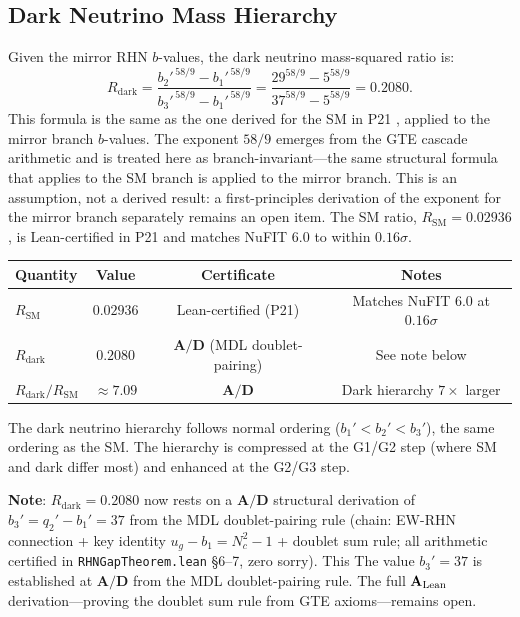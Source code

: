\documentclass[11pt]{article}
\newcommand{\CatAL}{\ensuremath{\textbf{A}_{\rm Lean}}}
\newcommand{\CatAD}{\textbf{A/D}}
\begin{document}
\subsection{Dark Neutrino Mass Hierarchy}
\label{ssec:dark_nu_mass}

Given the mirror RHN $b$-values, the dark neutrino mass-squared ratio is:
\begin{equation}
R_\mathrm{dark}
= \frac{b_2'^{\,58/9} - b_1'^{\,58/9}}{b_3'^{\,58/9} - b_1'^{\,58/9}}
= \frac{29^{58/9} - 5^{58/9}}{37^{58/9} - 5^{58/9}}
= 0.2080.
\label{eq:r_dark}
\end{equation}
This formula is the same as the one derived for the SM in P21 \cite{SpivackNeutrino},
applied to the mirror branch $b$-values. The exponent $58/9$ emerges from the GTE
cascade arithmetic and is treated here as branch-invariant---the same structural formula
that applies to the SM branch is applied to the mirror branch. This is an assumption,
not a derived result: a first-principles derivation of the exponent for the mirror branch
separately remains an open item. The SM ratio, $R_\mathrm{SM} = 0.02936$, is
Lean-certified in P21 and matches NuFIT 6.0 \cite{NuFIT60} to within $0.16\sigma$.

\begin{center}
\begin{tabular}{lccc}
\toprule
Quantity & Value & Certificate & Notes \\
\midrule
$R_\mathrm{SM}$ & $0.02936$ & Lean-certified (P21) & Matches NuFIT 6.0 at $0.16\sigma$ \\
$R_\mathrm{dark}$ & $0.2080$ & $\CatAD$ (MDL doublet-pairing) & See note below \\
$R_\mathrm{dark}/R_\mathrm{SM}$ & $\approx 7.09$ & $\CatAD$ & Dark hierarchy $7\times$ larger \\
\bottomrule
\end{tabular}
\end{center}

The dark neutrino hierarchy follows normal ordering ($b_1' < b_2' < b_3'$), the same
ordering as the SM. The hierarchy is compressed at the G1/G2 step (where SM and dark
differ most) and enhanced at the G2/G3 step.

\textbf{Note}: $R_\mathrm{dark} = 0.2080$ now rests on a $\CatAD$ structural
derivation of $b_3' = q_2' - b_1' = 37$ from the MDL doublet-pairing rule
(chain: EW-RHN connection + key identity $u_g - b_1 = N_c^2-1$ + doublet sum rule;
all arithmetic certified in \texttt{RHNGapTheorem.lean} \S6--7, zero sorry). This
The value $b_3'=37$ is established at $\CatAD$ from the MDL doublet-pairing rule. The
full $\CatAL$ derivation---proving the doublet sum rule from GTE axioms---remains open.
\end{document}
